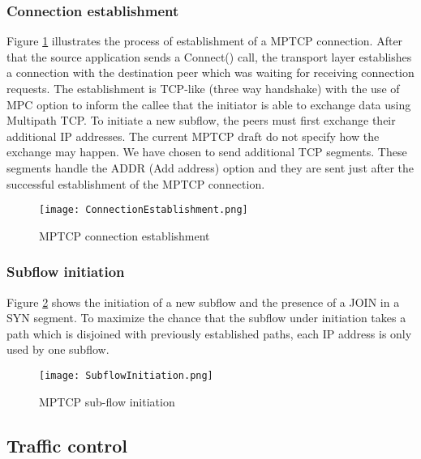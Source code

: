\documentclass{sig-alternate}
\begin{document}
\subsubsection{Connection establishment}

Figure \ref{ConEstab} illustrates the process of establishment of a MPTCP connection. After that the source application sends a Connect() call, the transport layer establishes a connection with the destination peer which was waiting for receiving connection requests. The establishment is TCP-like (three way handshake) with the use of MPC option to inform the callee that the initiator is able to exchange data using Multipath TCP. To initiate a new subflow, the peers must first exchange their additional IP addresses. The current MPTCP draft do not specify how the exchange may happen. We have chosen to send additional TCP segments. These segments handle the ADDR (Add address) option and they are sent just after the successful establishment of the MPTCP connection.

\begin{figure}[h]
\centering
\texttt{[image: ConnectionEstablishment.png]} 
\caption{MPTCP connection establishment}
\label{ConEstab}
\end{figure} 

\subsubsection{Subflow initiation}

Figure \ref{SubflowInit} shows the initiation of a new subflow and the presence of a JOIN in a SYN segment. To maximize the chance that the subflow under initiation takes a path which is disjoined with previously established paths, each IP address is only used by one subflow.


\begin{figure}[h]
\centering
\texttt{[image: SubflowInitiation.png]} 
\caption{MPTCP sub-flow initiation}
\label{SubflowInit}
\end{figure} 


\subsection{Traffic control}
\end{document}
